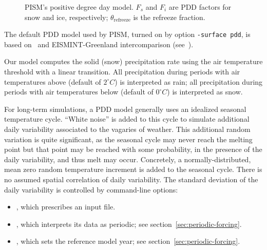 \documentclass[titlepage,letterpaper,final]{scrartcl}
\begin{document}
\begin{figure}
  \caption{PISM's positive degree day model. $F_s$ and $F_i$ are PDD
    factors for snow and ice, respectively; $\theta_{\text{refreeze}}$
    is the refreeze fraction.}
  \label{fig:pdd-model}
\end{figure}

The default PDD model used by PISM, turned on by option
\texttt{-surface pdd}, is based on~\cite{CalovGreve05} and
EISMINT-Greenland intercomparison (see~\cite{RitzEISMINT}).

Our model computes the solid (snow) precipitation rate using the air
temperature threshold with a linear transition. All precipitation
during periods with air temperatures above
 (default of $2^\circ C$) is
interpreted as rain; all precipitation during periods with air
temperatures below  (default of
$0^\circ C$) is interpreted as snow.

For long-term simulations, a PDD model generally uses an idealized
seasonal temperature cycle. ``White noise'' is added to this cycle to simulate
additional daily variability associated to the vagaries of weather. This
additional random variation is quite significant, as the seasonal cycle may
never reach the melting point but that point may be reached with some
probability, in the presence of the daily variability, and thus melt may occur.
Concretely, a normally-distributed, mean zero random temperature increment is
added to the seasonal cycle. There is no assumed spatial correlation of daily
variability. The standard deviation of the daily variability is controlled by
command-line options:

\begin{itemize}
\item {}, which prescribes an input file.
\item {}, which interprets its data
  as periodic; see section~\ref{sec:periodic-forcing}.
\item {}, which sets the reference model year;
  see section~\ref{sec:periodic-forcing}.
\end{itemize}
\end{document}
